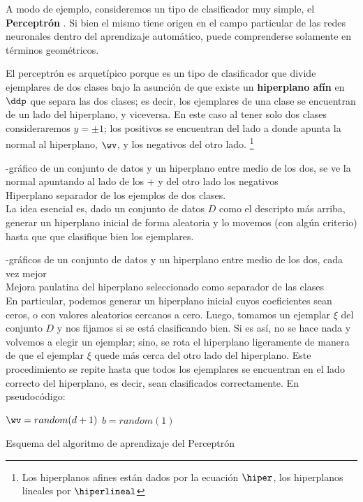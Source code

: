 
A modo de ejemplo, consideremos un tipo de clasificador muy simple, el \textbf{Perceptrón} \cite{rosenblatt1958}. Si bien el mismo tiene origen en el campo particular de las redes neuronales dentro del aprendizaje automático, puede comprenderse solamente en términos geométricos. 

El perceptrón es arquetípico porque es un tipo de clasificador que divide ejemplares de dos clases bajo la asunción de que existe un \textbf{hiperplano afín} en $\ddp$ que separa las dos clases; es decir, los ejemplares de una clase se encuentran de un lado del hiperplano, y viceversa. En este caso al tener solo dos clases consideraremos $y=\pm 1$; los positivos se encuentran del lado a donde apunta la normal al hiperplano, $\wv$, y los negativos del otro lado. \footnote{Los hiperplanos afines están dados por la ecuación $\hiper$, los hiperplanos lineales por $\hiperlineal$}

-gráfico de un conjunto de datos y un hiperplano entre medio de los dos, se ve la normal apuntando al lado de los + y del otro lado los negativos \\
Hiperplano separador de los ejemplos de dos clases.\\

La idea esencial es, dado un conjunto de datos $D$ como el descripto más arriba, generar un hiperplano inicial de forma aleatoria y lo movemos (con algún criterio) hasta que que clasifique bien los ejemplares.

-gráficos de un conjunto de datos y un hiperplano entre medio de los dos, cada vez mejor\\
Mejora paulatina del hiperplano seleccionado como separador de las clases\\

En particular, podemos generar un hiperplano inicial cuyos coeficientes sean ceros, o con valores aleatorios cercanos a cero. Luego, tomamos un ejemplar $\xi$ del conjunto $D$ y nos fijamos si se está clasificando bien. Si es así, no se hace nada y volvemos a elegir un ejemplar; sino, se rota el hiperplano ligeramente de manera de que el ejemplar $\xi$ quede más cerca del otro lado del hiperplano. Este procedimiento se repite hasta que todos los ejemplares se encuentran en el lado correcto del hiperplano, es decir, sean clasificados correctamente. En pseudocódigo:

\begin{algorithm}[H]
$\wv=random(d+1)$\;
$b=random(1)$\;
\caption{Esquema del algoritmo de aprendizaje del Perceptrón} 
\end{algorithm}

